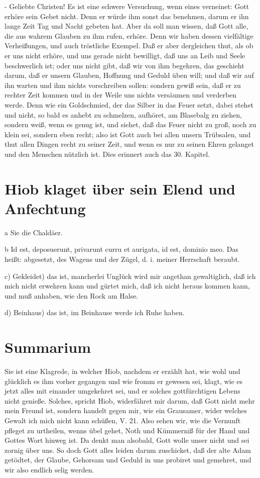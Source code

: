 - Geliebte Christen! Es ist eine schwere Versuchung, wenn eines verneinet: Gott erhöre sein Gebet nicht. Denn er würde ihm sonst das benehmen, darum er ihn lange Zeit Tag und Nacht gebeten hat. Aber da soll man wissen, daß Gott alle, die aus wahrem Glauben zu ihm rufen, erhöre. Denn wir haben dessen vielfältige Verheißungen, und auch tröstliche Exempel. Daß er aber dergleichen thut, als ob er uns nicht erhöre, und uns gerade nicht bewilligt, daß uns an Leib und Seele beschwerlich ist; oder uns nicht gibt, daß wir von ihm begehren, das geschieht darum, daß er unsern Glauben, Hoffnung und Geduld üben will; und daß wir auf ihn warten und ihm nichts vorschreiben sollen: sondern gewiß sein, daß er zu rechter Zeit kommen und in der Weile uns nichts versäumen und verderben werde. Denn wie ein Goldschmied, der das Silber in das Feuer setzt, dabei stehet und nicht, so bald es anhebt zu schmelzen, aufhöret, am Blasebalg zu ziehen, sondern weiß, wenn es genug ist, und siehet, daß das Feuer nicht zu groß, noch zu klein sei, sondern eben recht; also ist Gott auch bei allen unsern Trübsalen, und thut allen Dingen recht zu seiner Zeit, und wenn es nur zu seinen Ehren gelanget und den Menschen nützlich ist. Dies erinnert auch das 30. Kapitel.

\section{Hiob klaget über sein Elend und Anfechtung}

a Sie die Chaldäer.

b Id est, deposuerunt, privarunt curru et aurigata, id est, dominio meo. Das heißt: abgesetzt, des Wagens und der Zügel, d. i. meiner Herrschaft beraubt.

c) Gekleidet) das ist, mancherlei Unglück wird mir angethan gewaltiglich, daß ich mich nicht erwehren kann und gürtet mich, daß ich nicht heraus kommen kann, und muß anhaben, wie den Rock am Halse.

d) Beinhaus) das ist, im Beinhause werde ich Ruhe haben.

\section{Summarium}

Sie ist eine Klagrede, in welcher Hiob, nachdem er erzählt hat, wie wohl und glücklich es ihm vorher gegangen und wie fromm er gewesen sei, klagt, wie es jetzt alles mit einander umgekehret sei, und er solches gottfürchtigen Lebens nicht genieße. Solches, spricht Hiob, widerfähret mir darum, daß Gott nicht mehr mein Freund ist, sondern handelt gegen mir, wie ein Grausamer, wider welches Gewalt ich mich nicht kann schüßen, V. 21. Also sehen wir, wie die Vernunft pfleget zu urtheilen, wenns übel gehet, Noth und Kümmerniß für der Hand und Gottes Wort hinweg ist. Da denkt man alsobald, Gott wolle unser nicht und sei zornig über uns. So doch Gott alles leiden darum zuschicket, daß der alte Adam getödtet, der Glaube, Gehorsam und Geduld in uns probiret und gemehret, und wir also endlich selig werden.


